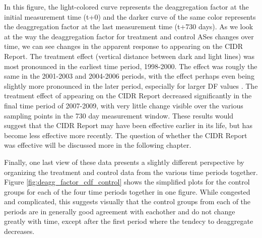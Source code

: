 In this figure, the light-colored curve represents the deaggregation factor at
the initial measurement time (t+0) and the darker curve of the same color
represents the deaggregation factor at the last measurement time (t+730 days).
As we look at the way the deaggregation factor for treatment and control ASes
changes over time, we can see changes in the apparent response to appearing on
the CIDR Report. The treatment effect (vertical distance between dark and light
lines) was most pronounced in the earliest time period, 1998-2000. The effect
was rougly the same in the 2001-2003 and 2004-2006 periods, with the effect
perhaps even being slightly more pronounced in the later period, especially for
larger DF values . The treatment effect of appearing on the
CIDR Report decreased significantly in the final time period of 2007-2009, with
very little change visible over the various sampling points in the 730 day
measurement window. These results would suggest that the CIDR Report may have
been effective earlier in its life, but has become less effective more
recently. The question of whether the CIDR Report was effective will be
discussed more in the following chapter.

Finally, one last view of these data presents a slightly different perspective
by organizing the treatment and control data from the various time periods
together. Figure \ref{fig:deagg_factor_cdf_control} shows the simplified plots
for the control groups for each of the four time periods together in one
figure. While congested and complicated, this suggests visually that the
control groups from each of the periods are in generally good agreement with
eachother and do not change greatly with time, except after the first period
where the tendecy to deaggregate decreases. 

